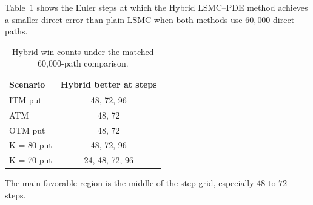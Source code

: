\documentclass[11pt,a4paper]{article}
\begin{document}
Table~1 shows the Euler steps at which the Hybrid LSMC--PDE method achieves a smaller direct error than plain LSMC when both methods use \(60{,}000\) direct paths.

\begin{table}[h!]
\centering
\caption{Hybrid win counts under the matched 60,000-path comparison.}
\begin{tabular}{lc}
\toprule
Scenario & Hybrid better at steps \\
\midrule
ITM put & 48, 72, 96 \\
ATM & 48, 72 \\
OTM put & 48, 72 \\
K = 80 put & 48, 72, 96 \\
K = 70 put & 24, 48, 72, 96 \\
\bottomrule
\end{tabular}
\end{table}

The main favorable region is the middle of the step grid, especially \(48\) to \(72\) steps.
\end{document}
